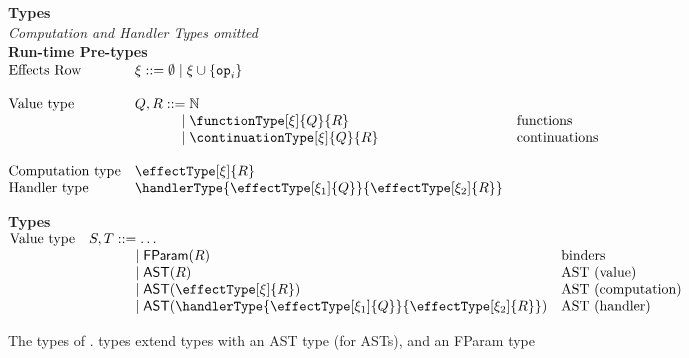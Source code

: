 \begin{figure}[t]
  \begin{core-desc}
    {\large {\textbf{Types}}}\\
    \textit{Computation and Handler Types omitted}\\

    \textbf{Run-time Pre-types}\\
    $\begin{array}{@{}lllr}
    \text{Effects Row} & \xi ::= \emptyset \mid \xi \cup \{ \texttt{op}_i \} \\
    \\
    \text{Value type} & Q,R ::= \mathbb{N} & \\
                              &\quad\quad\quad\,\, \mid \functionType[\xi]{Q}{R} & \text{functions}\\
                              &\quad\quad\quad\,\, \mid \continuationType[\xi]{Q}{R} & \text{continuations}\\ \\
    \text{Computation type} & \effectType[\xi]{R} \\
    \text{Handler type} & \handlerType{\effectType[\xi_1]{Q}}{\effectType[\xi_2]{R}}
    \end{array}$
    
    \vspace{4mm}

    \textbf{Types}\\
  $\begin{array}{@{}lllr}
    \text{Value type} & S, T ::= \ldots\\
                              &\quad\quad\quad\,\, \mid \textsf{FParam}(R) & \text{binders}\\
                              &\quad\quad\quad\,\, \mid \textsf{AST}(R) & \text{AST (value)}\\
                              &\quad\quad\quad\,\, \mid \textsf{AST}(\effectType[\xi]{R}) & \text{AST (computation)}\\
                              &\quad\quad\quad\,\, \mid \textsf{AST}(\handlerType{\effectType[\xi_1]{Q}}{\effectType[\xi_2]{R}}) & \text{AST (handler)}\\
  \end{array}$
  \end{core-desc}
  \caption{The types of \coreLang{}. \coreLang{} types extend \efflang{} types with an \textsf{AST} type (for ASTs), and an \textsf{FParam} type}%
  \label{fig:core-types}
\end{figure}

